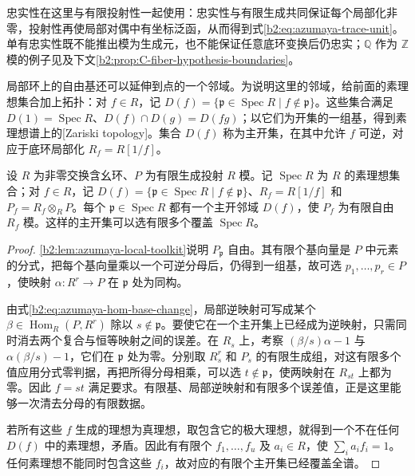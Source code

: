 
忠实性在这里与有限投射性一起使用：忠实性与有限生成共同保证每个局部化非零，投射性再使局部对偶中有坐标泛函，从而得到式\eqref{b2:eq:azumaya-trace-unit}。单有忠实性既不能推出模为生成元，也不能保证任意底环变换后仍忠实；\(\mathbb Q\) 作为 \(\mathbb Z\) 模的例子见及下文\cref{b2:prop:C-fiber-hypothesis-boundaries}。

\ProseParagraphBreak
局部环上的自由基还可以延伸到点的一个邻域。为说明这里的邻域，给前面的素理想集合加上拓扑：对 \(f\in R\)，记 \(D(f)=\{\mathfrak p\in\operatorname{Spec}R\mid f\notin\mathfrak p\}\)。这些集合满足 \(D(1)=\operatorname{Spec}R\)、\(D(f)\cap D(g)=D(fg)\)；以它们为开集的一组基，得到素理想谱上的[Zariski topology]。集合 \(D(f)\) 称为主开集，在其中允许 \(f\) 可逆，对应于底环局部化 \(R_f=R[1/f]\)。

\begin{proposition}[局部基的延伸]\label{b2:prop:projective-basic-open-basis}
	设 \(R\) 为非零交换含幺环、\(P\) 为有限生成投射 \(R\) 模。记 \(\operatorname{Spec}R\) 为 \(R\) 的素理想集合；对 \(f\in R\)，记 \(D(f)=\{\mathfrak p\in\operatorname{Spec}R\mid f\notin\mathfrak p\}\)、\(R_f=R[1/f]\) 和 \(P_f=R_f\otimes_RP\)。每个 \(\mathfrak p\in\operatorname{Spec}R\) 都有一个主开邻域 \(D(f)\)，使 \(P_f\) 为有限自由 \(R_f\) 模。这样的主开集可以选有限多个覆盖 \(\operatorname{Spec}R\)。
\end{proposition}
\begin{proof}
	\cref{b2:lem:azumaya-local-toolkit}说明 \(P_{\mathfrak p}\) 自由。其有限个基向量是 \(P\) 中元素的分式，把每个基向量乘以一个可逆分母后，仍得到一组基，故可选 \(p_1,\ldots,p_r\in P\)，使映射 \(\alpha:R^r\rightarrow P\) 在 \(\mathfrak p\) 处为同构。

	由式\eqref{b2:eq:azumaya-hom-base-change}，局部逆映射可写成某个 \(\beta\in\operatorname{Hom}_R(P,R^r)\) 除以 \(s\notin\mathfrak p\)。要使它在一个主开集上已经成为逆映射，只需同时消去两个复合与恒等映射之间的误差。在 \(R_s\) 上，考察 \((\beta/s)\alpha-1\) 与 \(\alpha(\beta/s)-1\)，它们在 \(\mathfrak p\) 处为零。分别取 \(R_s^r\) 和 \(P_s\) 的有限生成组，对这有限多个值应用分式零判据，再把所得分母相乘，可以选 \(t\notin\mathfrak p\)，使两映射在 \(R_{st}\) 上都为零。因此 \(f=st\) 满足要求。有限基、局部逆映射和有限多个误差值，正是这里能够一次清去分母的有限数据。

	若所有这些 \(f\) 生成的理想为真理想，取包含它的极大理想，就得到一个不在任何 \(D(f)\) 中的素理想，矛盾。因此有有限个 \(f_1,\ldots,f_u\) 及 \(a_i\in R\)，使 \(\sum_i a_if_i=1\)。任何素理想不能同时包含这些 \(f_i\)，故对应的有限个主开集已经覆盖全谱。
\end{proof}

